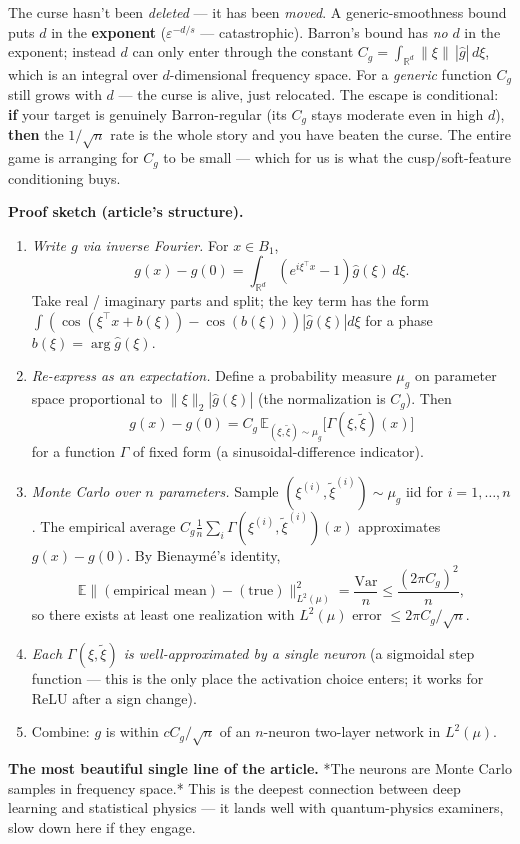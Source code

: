 \documentclass[11pt]{article}
\begin{document}
The curse hasn't been \emph{deleted} --- it has been \emph{moved}. A generic-smoothness
bound puts $d$ in the \textbf{exponent} ($\varepsilon^{-d/s}$ --- catastrophic).
Barron's bound has \emph{no} $d$ in the exponent; instead $d$ can only enter
through the constant $C_g = \int_{\mathbb R^d}\|\xi\|\,|\hat g|\,d\xi$, which
is an integral over $d$-dimensional frequency space. For a \emph{generic}
function $C_g$ still grows with $d$ --- the curse is alive, just relocated.
The escape is conditional: \textbf{if} your target is genuinely Barron-regular
(its $C_g$ stays moderate even in high $d$), \textbf{then} the $1/\sqrt n$ rate
is the whole story and you have beaten the curse. The entire game is
arranging for $C_g$ to be small --- which for us is what the cusp/soft-feature
conditioning buys.

\textbf{Proof sketch (article's structure).}

\begin{enumerate}
\item \emph{Write $g$ via inverse Fourier.} For $x \in B_1$,
\[g(x) - g(0) = \int_{\mathbb R^d} (e^{i\xi^\top x} - 1) \hat g(\xi)
   \, d\xi.\]
Take real / imaginary parts and split; the key term has the form
$\int (\cos(\xi^\top x + b(\xi)) - \cos(b(\xi))) |\hat g(\xi)| d\xi$ for
a phase $b(\xi) = \arg \hat g(\xi)$.
\item \emph{Re-express as an expectation.} Define a probability measure $\mu_g$ on
parameter space proportional to $\|\xi\|_2 |\hat g(\xi)|$ (the
normalization is $C_g$). Then
\[g(x) - g(0) = C_g \, \mathbb E_{(\xi, \tilde\xi) \sim \mu_g}
   \bigl[\Gamma(\xi, \tilde\xi)(x)\bigr]\]
for a function $\Gamma$ of fixed form (a sinusoidal-difference
indicator).
\item \emph{Monte Carlo over $n$ parameters.} Sample $(\xi^{(i)}, \tilde\xi^{(i)})
   \sim \mu_g$ iid for $i = 1, \dots, n$. The empirical average
$C_g \frac1n \sum_i \Gamma(\xi^{(i)}, \tilde\xi^{(i)})(x)$
approximates $g(x) - g(0)$. By Bienaym\'e's identity,
\[\mathbb E\|(\text{empirical mean}) - (\text{true})\|_{L^2(\mu)}^2
   = \frac{\mathrm{Var}}{n} \le \frac{(2\pi C_g)^2}{n},\]
so there exists at least one realization with $L^2(\mu)$ error
$\le 2\pi C_g / \sqrt n$.
\item \emph{Each $\Gamma(\xi, \tilde\xi)$ is well-approximated by a single neuron}
(a sigmoidal step function --- this is the only place the activation
choice enters; it works for ReLU after a sign change).
\item Combine: $g$ is within $c C_g / \sqrt n$ of an $n$-neuron two-layer
network in $L^2(\mu)$.
\end{enumerate}
\textbf{The most beautiful single line of the article.} *The neurons are Monte
Carlo samples in frequency space.* This is the deepest connection between
deep learning and statistical physics --- it lands well with quantum-physics
examiners, slow down here if they engage.
\end{document}
